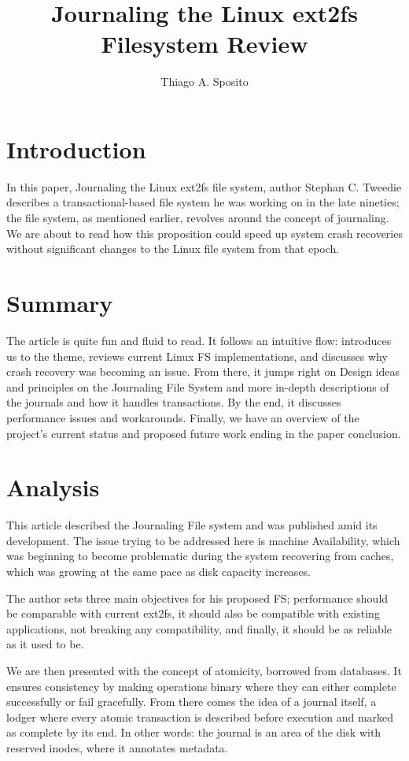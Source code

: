 \documentclass[12pt]{article}
\title{Journaling the Linux ext2fs Filesystem Review}
\author{Thiago A. Sposito\inst{1} }
\begin{document}
 

\maketitle


\section{Introduction}

In this paper, Journaling the Linux ext2fs file system, author Stephan C. Tweedie describes a transactional-based file system he was working on in the late nineties\cite{tweedie1998journaling}; the file system, as mentioned earlier, revolves around the concept of journaling. We are about to read how this proposition could speed up system crash recoveries without significant changes to the Linux file system from that epoch.

\section{Summary}
The article is quite fun and fluid to read. It follows an intuitive flow: introduces us to the theme, reviews current Linux FS implementations, and discusses why crash recovery was becoming an issue. From there, it jumps right on Design ideas and principles on the Journaling File System and more in-depth descriptions of the journals and how it handles transactions. By the end, it discusses performance issues and workarounds. Finally, we have an overview of the project's current status and proposed future work ending in the paper conclusion.

\section{Analysis}
This article described the Journaling File system and was published amid its development. The issue trying to be addressed here is machine Availability, which was beginning to become problematic during the system recovering from caches, which was growing at the same pace as disk capacity increases.

The author sets three main objectives for his proposed FS; performance should be comparable with current ext2fs, it should also be compatible with existing applications, not breaking any compatibility, and finally, it should be as reliable as it used to be.

We are then presented with the concept of atomicity, borrowed from databases. It ensures consistency by making operations binary where they can either complete successfully or fail gracefully. From there comes the idea of a journal itself, a lodger where every atomic transaction is described before execution and marked as complete by its end. In other words: the journal is an area of the disk with reserved inodes, where it annotates metadata.
\end{document}
